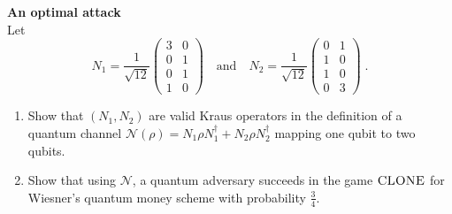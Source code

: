 \begin{exercises}
\item {\bf An optimal attack}\label{ex:opt-wiesner}\\
Let 
\[ N_1 = \frac{1}{\sqrt{12}} \begin{pmatrix} 3 & 0 \\ 0 & 1 \\ 0 & 1 \\ 1 & 0 \end{pmatrix} \quad \text{and}\quad N_2 = \frac{1}{\sqrt{12}} \begin{pmatrix} 0 & 1 \\ 1 & 0 \\ 1 & 0 \\ 0 & 3\end{pmatrix}\;.\]
\begin{enumerate}
\item Show that $(N_1,N_2)$ are valid Kraus operators in the definition of a quantum channel $\mathcal{N}(\rho)=N_1\rho N_1^\dagger + N_2 \rho N_2^\dagger$ mapping one qubit to two qubits. 
\item Show that using $\mathcal{N}$, a quantum adversary succeeds in the game $\textsc{CLONE}$ for Wiesner's quantum money scheme with probability $\frac{3}{4}$. 
\end{enumerate}
\end{exercises}
